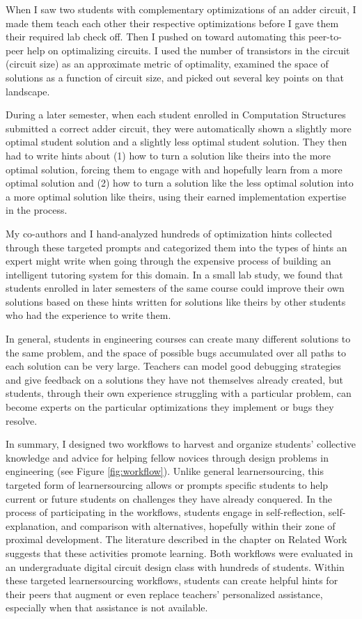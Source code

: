 When I saw two students with complementary optimizations of an adder circuit, I made them teach each other their respective optimizations before I gave them their required lab check off. Then I pushed on toward automating this peer-to-peer help on optimalizing circuits. I used the number of transistors in the circuit (circuit size) as an approximate metric of optimality, examined the space of solutions as a function of circuit size, and picked out several key points on that landscape. 

During a later semester, when each student enrolled in Computation Structures submitted a correct adder circuit, they were automatically shown a slightly more optimal student solution and a slightly less optimal student solution. They then had to write hints about (1) how to turn a solution like theirs into the more optimal solution, forcing them to engage with and hopefully learn from a more optimal solution and (2) how to turn a solution like the less optimal solution into a more optimal solution like theirs, using their earned implementation expertise in the process. 

My co-authors and I hand-analyzed hundreds of optimization hints collected through these targeted prompts and categorized them into the types of hints an expert might write when going through the expensive process of building an intelligent tutoring system for this domain. In a small lab study, we found that students enrolled in later semesters of the same course could improve their own solutions based on these hints written for solutions like theirs by other students who had the experience to write them. 

In general, students in engineering courses can create many different solutions to the same problem, and the space of possible bugs accumulated over all paths to each solution can be very large. Teachers can model good debugging strategies and give feedback on a solutions they have not themselves already created, but students, through their own experience struggling with a particular problem, can become experts on the particular optimizations they implement or bugs they resolve. %

In summary, I designed two workflows to harvest and organize students' collective knowledge and advice for helping fellow novices through design problems in engineering (see Figure \ref{fig:workflow}). Unlike general learnersourcing, this targeted form of learnersourcing allows or prompts specific students to help current or future students on challenges they have already conquered. In the process of participating in the workflows, students engage in self-reflection, self-explanation, and comparison with alternatives, hopefully within their zone of proximal development. The literature described in the chapter on Related Work suggests that these activities promote learning. Both workflows were evaluated in an undergraduate digital circuit design class with hundreds of students. Within these targeted learnersourcing workflows, students can create helpful hints for their peers that augment or even replace teachers' personalized assistance, especially when that assistance is not available. 

